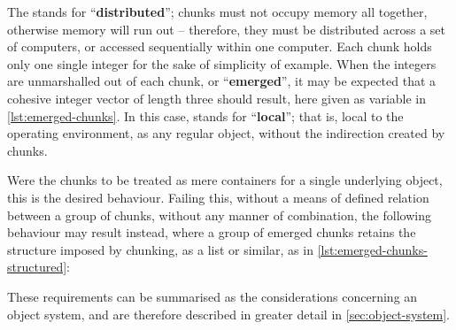 
The  stands for ``\textbf{distributed}''; chunks must not
occupy memory all together, otherwise memory will run out -- therefore,
they must be distributed across a set of computers, or accessed
sequentially within one computer. Each chunk holds only one single
integer for the sake of simplicity of example. When the integers are
unmarshalled out of each chunk, or ``\textbf{emerged}'', it may be
expected that a cohesive integer vector of length three should result,
here given as variable  in \cref{lst:emerged-chunks}. In this case,  stands for
``\textbf{local}''; that is, local to the operating environment, as any
regular object, without the indirection created by chunks.


Were the chunks to be treated as mere containers for a single underlying
object, this is the desired behaviour. Failing this, without a means of
defined relation between a group of chunks, without any manner of
combination, the following behaviour may result instead, where a group
of emerged chunks retains the structure imposed by chunking, as a list
or similar, as in \cref{lst:emerged-chunks-structured}:


These requirements can be summarised as the considerations concerning an
object system, and are therefore described in greater detail in
\cref{sec:object-system}.
